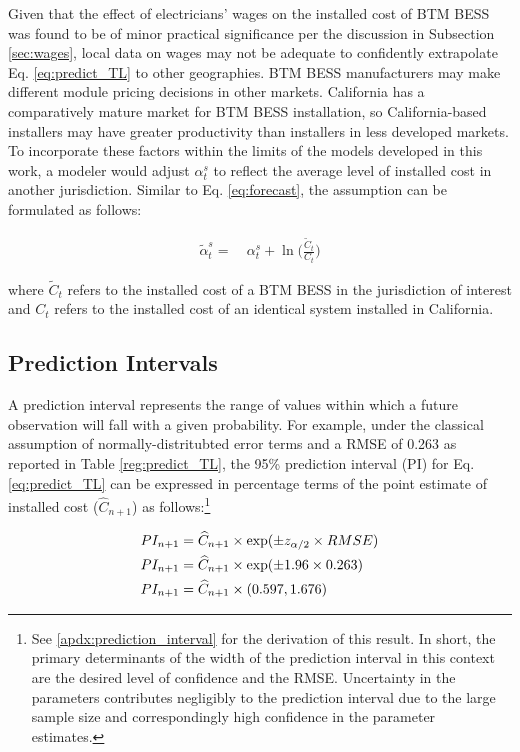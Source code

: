 \documentclass[preprint,12pt,authoryear]{elsarticle}
\begin{document}
Given that the effect of electricians' wages on the installed cost of BTM BESS was found to be of minor practical significance per the discussion in Subsection \ref{sec:wages}, local data on wages may not be adequate to confidently extrapolate Eq. \ref{eq:predict_TL} to other geographies. BTM BESS manufacturers may make different module pricing decisions in other markets. California has a comparatively mature market for BTM BESS installation, so California-based installers may have greater productivity than installers in less developed markets. To incorporate these factors within the limits of the models developed in this work, a modeler would adjust $\alpha^s_t$ to reflect the average level of installed cost in another jurisdiction. Similar to Eq. \ref{eq:forecast}, the assumption can be formulated as follows:

\begin{align}
    \tilde{\alpha}^{s}_{t} = &~\alpha^{s}_{t} + \ln\bigg(\frac{\tilde{C}_{t}}{C_{t}}\bigg) \label{eq:extrapolate}
\end{align}

where $\tilde{C}_{t}$ refers to the installed cost of a BTM BESS in the jurisdiction of interest and $C_{t}$ refers to the installed cost of an identical system installed in California.

\subsection{Prediction Intervals}\label{sec:prediction_interval}

A prediction interval represents the range of values within which a future observation will fall with a given probability. For example, under the classical assumption of normally-distritubted error terms and a RMSE of 0.263 as reported in Table \ref{reg:predict_TL}, the 95\% prediction interval (PI) for Eq. \ref{eq:predict_TL} can be expressed in percentage terms of the point estimate of installed cost ($\widehat{C}_{n+1}$) as follows:\footnote{See \ref{apdx:prediction_interval} for the derivation of this result. In short, the primary determinants of the width of the prediction interval in this context are the desired level of confidence and the RMSE. Uncertainty in the parameters contributes negligibly to the prediction interval due to the large sample size and correspondingly high confidence in the parameter estimates.}

\begin{align}
PI_{n+1} &= \widehat{C}_{n+1} \times \exp(\pm z_{\alpha/2} \times RMSE) \label{eq:pi_normal} \\
PI_{n+1} &= \widehat{C}_{n+1} \times \exp(\pm 1.96 \times 0.263) \notag \\
PI_{n+1} &= \widehat{C}_{n+1} \times (0.597, 1.676) \notag
\end{align}
\end{document}
